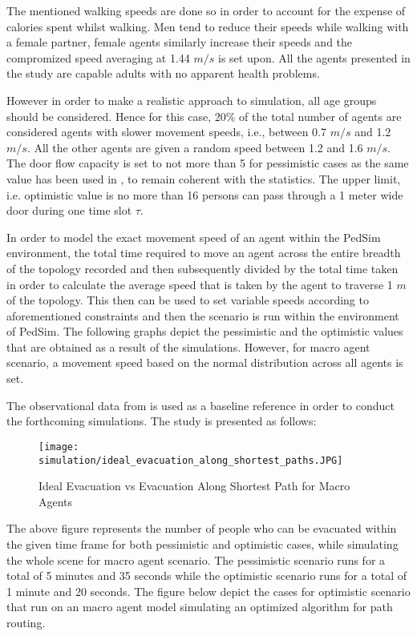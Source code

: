 The mentioned walking speeds are done so in order to account for the expense of calories spent whilst walking. Men tend to reduce their speeds while walking with a female partner, female agents similarly increase their speeds and the compromized speed averaging at 1.44 $m/s$ is set upon. All the agents presented in the study are capable adults with no apparent health problems. 

However in order to make a realistic approach to simulation, all age groups should be considered. Hence for this case, 20\% of the total number of agents are considered agents with slower movement speeds, i.e., between 0.7 $m/s$ and 1.2 $m/s$. All the other agents are given a random speed between 1.2 and 1.6 $m/s$. The door flow capacity is set to not more than 5 for pessimistic cases as the same value has been used in \cite{ref5}, to remain coherent with the statistics. The upper limit, i.e. optimistic value is no more than 16 persons can pass through a 1 meter wide door during one time slot $\tau$. 

In order to model the exact movement speed of an agent within the PedSim environment, the total time required to move an agent across the entire breadth of the topology recorded and then subsequently divided by the total time taken in order to calculate the average speed that is taken by the agent to traverse 1 $m$ of the topology. This then can be used to set variable speeds according to aforementioned constraints and then the scenario is run within the environment of PedSim. The following graphs depict the pessimistic and the optimistic values that are obtained as a result of the simulations. However, for macro agent scenario, a movement speed based on the normal distribution across all agents is set.

The observational data from \cite{ref5} is used as a baseline reference in order to conduct the forthcoming simulations. The study is presented as follows:

\begin{figure}[H]
  \centering
  \texttt{[image: simulation/ideal\_evacuation\_along\_shortest\_paths.JPG]}
  \caption{Ideal Evacuation vs Evacuation Along Shortest Path for Macro Agents}
  \label{Ideal Evacuation vs Evacuation Along Shortest Path for Macro Agents}
\end{figure}

The above figure represents the number of people who can be evacuated within the given time frame for both pessimistic and optimistic cases, while simulating the whole scene for macro agent scenario. The pessimistic scenario runs for a total of 5 minutes and 35 seconds while the optimistic scenario runs for a total of 1 minute and 20 seconds. The figure below depict the cases for optimistic scenario that run on an macro agent model simulating an optimized algorithm for path routing.

